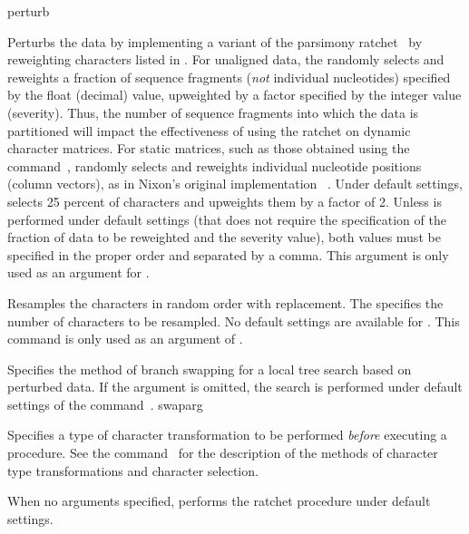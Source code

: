 \begin{command}{perturb}{}
\begin{arguments}
{Perturbs the data by implementing a variant of the parsimony
ratchet~\cite{Nixon1999} by reweighting characters listed in . 
For unaligned data, the  randomly selects and reweights a fraction of
sequence fragments (\emph{not} individual nucleotides) specified
by the float (decimal) value, upweighted by a factor specified by the integer
value (severity). Thus, the number of sequence fragments into which the 
data is partitioned will impact the effectiveness of using the ratchet on dynamic character matrices. 
For static matrices, such as those obtained using the 
command~,  randomly selects and
reweights individual nucleotide positions (column vectors), as in Nixon's
original implementation ~\cite{Nixon1999}. 
Under default settings,
 selects 25 percent of characters and upweights
them by a factor of 2. Unless  is performed
under default settings (that does not require the specification of the
fraction of data to be reweighted and the severity value), both
values must be specified in the proper order and separated by a comma.
This argument is only used as an argument for .}
{}

{Resamples the characters in random order with
replacement. The \poyint specifies the number of characters to be resampled.
No default settings are available for . This
command is only used as an argument of .}
{}

{Specifies the method of branch swapping for a local tree search
based on perturbed data. If the argument 
is omitted, the search is performed under default settings of the
command~.}
{swaparg}

{Specifies a type of character transformation to be performed
\emph{before} executing a  procedure.
See the command~ for
the description of the methods of character type transformations
and character selection.}
{}

\end{arguments}

{When no arguments specified, \poy performs the ratchet procedure under
default settings.}


\end{command}
